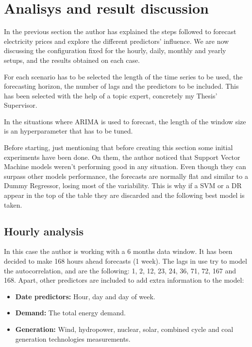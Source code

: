\chapter{Analisys and result discussion}
In the previous section the author has explained the steps followed to forecast electricity prices and explore the different predictors' influence. We are now discussing the configuration fixed for the hourly, daily, monthly and yearly setups, and the results obtained on each case.

For each scenario has to be selected the length of the time series to be used, the forecasting horizon, the number of lags and the predictors to be included. This has been selected with the help of a topic expert, concretely my Thesis' Supervisor.

In the situations where ARIMA is used to forecast, the length of the window size is an hyperparameter that has to be tuned.

Before starting, just mentioning that before creating this section some initial experiments have been done. On them, the author noticed that Support Vector Machine models weren't performing good in any situation. Even though they can surpass other models performance, the forecasts are normally flat and similar to a Dummy Regressor, losing most of the variability. This is why if a SVM or a DR appear in the top of the table they are discarded and the following best model is taken.



\section{Hourly analysis}
In this case the author is working with a 6 months data window. It has been decided to make 168 hours ahead forecasts (1 week). The lags in use try to model the autocorrelation, and are the following: 1, 2, 12, 23, 24, 36, 71, 72, 167 and 168. Apart, other predictors are included to add extra information to the model:

\begin{itemize}
    \item \textbf{Date predictors:} Hour, day and day of week.
    \item \textbf{Demand:} The total energy demand.
    \item \textbf{Generation:} Wind, hydropower, nuclear, solar, combined cycle and coal generation technologies measurements.
\end{itemize}


